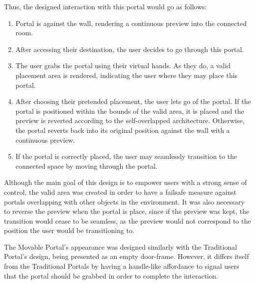Thus, the designed interaction with this portal would go as follows:

\begin{enumerate}
  \item Portal is against the wall, rendering a continuous preview into the connected room.
  \item After accessing their destination, the user decides to go through this portal.
  \item The user grabs the portal using their virtual hands. As they do, a valid placement area is rendered, indicating the user where they may 
  place this portal.
  \item After choosing their pretended placement, the user lets go of the portal. If the portal is positioned within the bounds of the valid area, 
  it is placed and the preview is reverted according to the self-overlapped architecture. Otherwise, the portal reverts back into its original 
  position against the wall with a continuous preview.
  \item If the portal is correctly placed, the user may seamlessly transition to the connected space by moving through the portal.
\end{enumerate}

Although the main goal of this design is to empower users with a strong sense of control, the valid area was created in order to have a failsafe 
measure against portals overlapping with other objects in the environment. It was also necessary to reverse the preview when the portal is place, 
since if the preview was kept, the transition would cease to be seamless, as the preview would not correspond to the position the user would be 
transitioning to. 

The Movable Portal's appearance was designed similarly with the Traditional Portal's design, being presented as an empty door-frame. However,
it differs itself from the Traditional Portals by having a handle-like affordance to signal users that the portal should be grabbed in order to 
complete the interaction.

